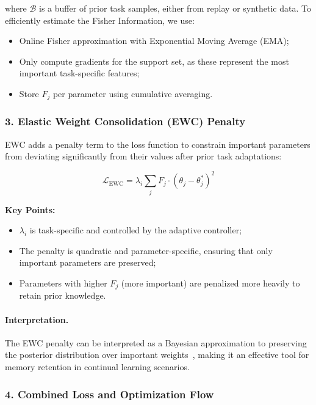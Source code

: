 \documentclass[conference]{IEEEtran}
\begin{document}
where $\mathcal{B}$ is a buffer of prior task samples, either from replay or synthetic data. To efficiently estimate the Fisher Information, we use:
\begin{itemize}
    \item Online Fisher approximation with Exponential Moving Average (EMA);
    \item Only compute gradients for the support set, as these represent the most important task-specific features;
    \item Store $F_j$ per parameter using cumulative averaging.
\end{itemize}

\subsubsection*{3. Elastic Weight Consolidation (EWC) Penalty}

EWC adds a penalty term to the loss function to constrain important parameters from deviating significantly from their values after prior task adaptations:

\begin{equation}
\mathcal{L}_{\text{EWC}} = \lambda_i \sum_j F_j \cdot (\theta_j - \theta_j^*)^2
\end{equation}

\textbf{Key Points:}
\begin{itemize}
    \item $\lambda_i$ is task-specific and controlled by the adaptive controller;
    \item The penalty is quadratic and parameter-specific, ensuring that only important parameters are preserved;
    \item Parameters with higher $F_j$ (more important) are penalized more heavily to retain prior knowledge.
\end{itemize}

\paragraph{Interpretation.}
The EWC penalty can be interpreted as a Bayesian approximation to preserving the posterior distribution over important weights~\cite{zenke2017continual}, making it an effective tool for memory retention in continual learning scenarios.

\subsubsection*{4. Combined Loss and Optimization Flow}
\end{document}
